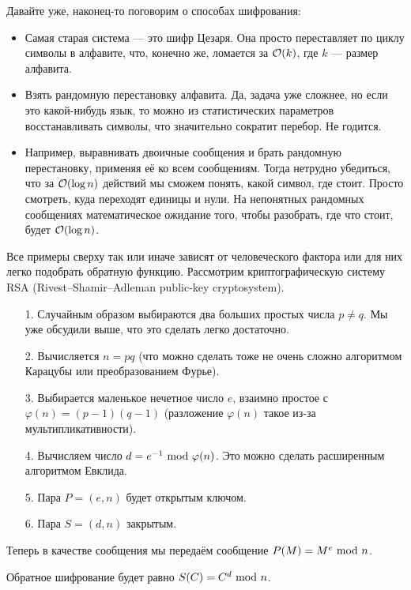 Давайте уже, наконец-то поговорим о способах шифрования:

\begin{itemize}
  \item Самая старая система --- это шифр Цезаря. Она просто переставляет по циклу
  символы в алфавите, что, конечно же, ломается за $\mathcal{O}(k)$, где $k$ --- размер
  алфавита.
  \item Взять рандомную перестановку алфавита. Да, задача уже сложнее, но
  если это какой-нибудь язык, то можно из статистических параметров
  восстанавливать символы, что значительно сократит перебор. Не годится.
  \item Например, выравнивать двоичные сообщения и брать рандомную перестановку,
  применяя её ко всем сообщениям. Тогда нетрудно убедиться, что за $\mathcal{O}(\log n)$
  действий мы сможем понять, какой символ, где стоит. Просто смотреть, куда
  переходят единицы и нули. На непонятных рандомных сообщениях математическое
  ожидание того, чтобы разобрать, где что стоит, будет $\mathcal{O}(\log n)$.
\end{itemize}

Все примеры сверху так или иначе зависят от человеческого фактора или
для них легко подобрать обратную функцию. Рассмотрим криптографическую систему
RSA (Rivest--Shamir--Adleman public-key cryptosystem).

\begin{itemize}
  \item[1.] Случайным образом выбираются два больших простых числа $p \neq q$. Мы
  уже обсудили выше, что это сделать легко достаточно.
  \item[2.] Вычисляется $n = pq$ (что можно сделать тоже не очень сложно
  алгоритмом Карацубы или преобразованием Фурье).
  \item[3.] Выбирается маленькое нечетное число $e$, взаимно простое с 
  $\varphi(n) = (p - 1)(q - 1)$ (разложение $\varphi(n)$ такое из-за мультипликативности).
  \item[4.] Вычисляем число $d = e^{-1} \ \text{mod} \  \varphi(n)$. Это можно сделать
  расширенным алгоритмом Евклида.
  \item[5.] Пара $P = (e, n)$ будет открытым ключом.
  \item[6.] Пара $S = (d, n)$ закрытым.
\end{itemize}

Теперь в качестве сообщения мы передаём сообщение $P(M) = M^{e} \ \text{mod} \  n$.

Обратное шифрование будет равно $S(C) = C^{d} \ \text{mod} \  n$.

